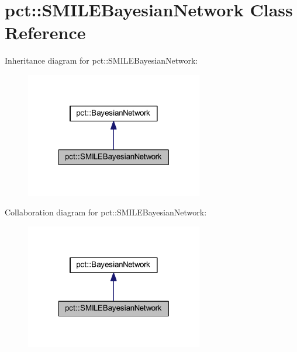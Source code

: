 \hypertarget{classpct_1_1_s_m_i_l_e_bayesian_network}{\section{pct\-:\-:S\-M\-I\-L\-E\-Bayesian\-Network Class Reference}
\label{classpct_1_1_s_m_i_l_e_bayesian_network}
}


Inheritance diagram for pct\-:\-:S\-M\-I\-L\-E\-Bayesian\-Network\-:\nopagebreak
\begin{figure}[H]
\begin{center}
\leavevmode
\includegraphics[width=220pt]{classpct_1_1_s_m_i_l_e_bayesian_network__inherit__graph}
\end{center}
\end{figure}


Collaboration diagram for pct\-:\-:S\-M\-I\-L\-E\-Bayesian\-Network\-:\nopagebreak
\begin{figure}[H]
\begin{center}
\leavevmode
\includegraphics[width=220pt]{classpct_1_1_s_m_i_l_e_bayesian_network__coll__graph}
\end{center}
\end{figure}
